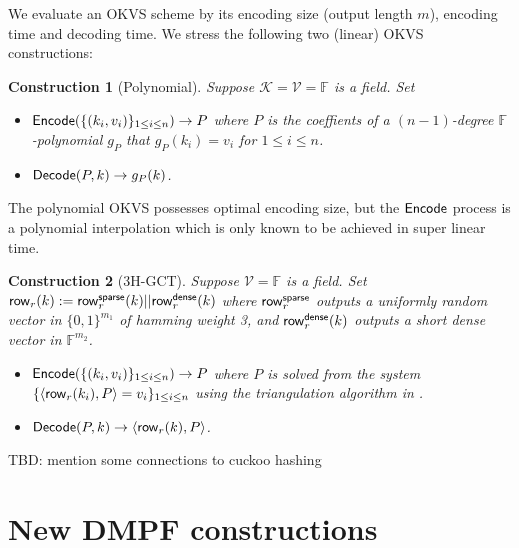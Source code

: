 \documentclass[sigconf]{acmart}
\newcommand{\Encode}{{\sf Encode}}
\newcommand{\Decode}{{\sf Decode}}
\newcommand{\row}{{\sf row}}
\newcommand{\FF}{\mathbb{F}}
\newcommand{\ipd}[2]{\langle #1, #2 \rangle}
\newtheorem{construction}{Construction}
\begin{document}
We evaluate an OKVS scheme by its encoding size (output length $m$), encoding time and decoding time. We stress the following two (linear) OKVS constructions:
\begin{construction}[Polynomial]
  Suppose $\mathcal{K} = \mathcal{V}=\FF$ is a field. Set 
  \begin{itemize}
    \item $\Encode(\{(k_i,v_i)\}_{1\le i\le n}) \rightarrow P$ where $P$ is the coeffients of a $(n-1)$-degree $\FF$-polynomial $g_P$ that $g_P(k_i) = v_i$ for $1\le i\le n$. 
    \item $\Decode(P,k)\rightarrow g_P(k)$. 
  \end{itemize}
\end{construction}
The polynomial OKVS possesses optimal encoding size, but the $\Encode$ process is a polynomial interpolation which is only known to be achieved in super linear time. 
\begin{construction}[3H-GCT\cite{cryptoeprint:2021/883,cryptoeprint:2022/320}]
  Suppose $\mathcal{V}=\FF$ is a field. Set $\row_r(k):=\row_r^{\sf sparse}(k)||\row_r^{\sf dense}(k)$ where $\row_r^{\sf sparse}$ outputs a uniformly random vector in $\{0,1\}^{m_1}$ of hamming weight 3, and $\row_r^{\sf dense}(k)$ outputs a short dense vector in $\FF^{m_2}$. 
  \begin{itemize}
    \item $\Encode(\{(k_i,v_i)\}_{1\le i\le n}) \rightarrow P$ where $P$ is solved from the system $\{\ipd{\row_r(k_i)}{P} = v_i\}_{1\le i\le n}$ using the triangulation algorithm in \cite{cryptoeprint:2022/320}. 
    \item $\Decode(P,k)\rightarrow \ipd{\row_r(k)}{P}$. 
  \end{itemize}
\end{construction}

TBD: mention some connections to cuckoo hashing






\section{New DMPF constructions}
\end{document}
